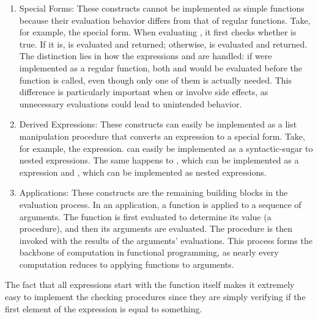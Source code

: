   \begin{enumerate}
    \item Special Forms: These constructs cannot be implemented as simple functions because their evaluation behavior differs from that of regular functions. Take, for example, the  special form. When evaluating , it first checks whether  is true. If it is,  is evaluated and returned; otherwise,  is evaluated and returned. The distinction lies in how the expressions  and  are handled: if  were implemented as a regular function, both  and  would be evaluated before the function is called, even though only one of them is actually needed. This difference is particularly important when  or  involve side effects, as unnecessary evaluations could lead to unintended behavior.
    \item Derived Expressions: These constructs can easily be implemented as a list manipulation procedure that converts an expression to a special form. Take, for example, the  expression.  can easily be implemented as a syntactic-sugar to nested  expressions. The same happens to , which can be implemented as a  expression and , which can be implemented as nested  expressions.
    \item Applications: These constructs are the remaining building blocks in the evaluation process. In an application, a function is applied to a sequence of arguments. The function is first evaluated to determine its value (a procedure), and then its arguments are evaluated. The procedure is then invoked with the results of the arguments' evaluations. This process forms the backbone of computation in functional programming, as nearly every computation reduces to applying functions to arguments.
  \end{enumerate}

  The fact that all expressions start with the function itself makes it extremely easy to implement the checking procedures since they are simply verifying if the first element of the expression is equal to something.

